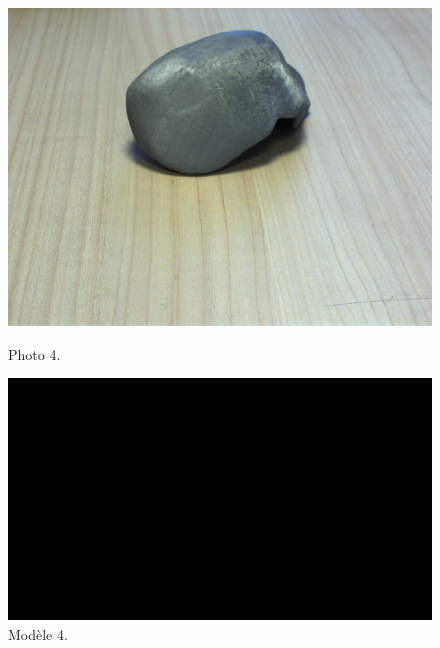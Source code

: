 \documentclass[12pt]{report}
\begin{document}
\begin{appendices}
\begin{figure}[H]
\centerline{\includegraphics[scale = 0.1]{img/Photo4.jpg}}
\caption{Photo 4.}
\endminipage\hfill
{}
\centerline{\includegraphics[scale = 0.22]{img/Model4.png}}
\caption{Modèle 4.}
\endminipage
\end{figure}


\end{appendices}
\end{document}
